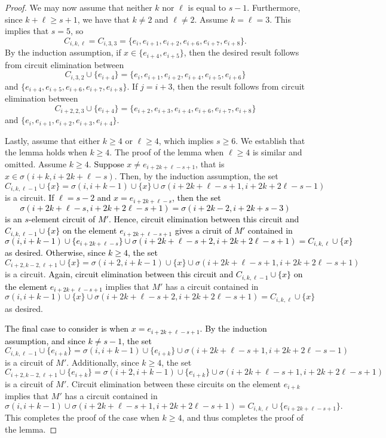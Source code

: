 \documentclass[11pt]{amsart}
\newcommand{\bloo}{\textcolor{black}}
\begin{document}
\begin{proof}
We may now assume that neither $k$ nor $\ell$ is equal to $s-1$. Furthermore, since $k+\ell \geq s+1$, we have that $k \neq 2$ and $\ell \neq 2$. Assume $k = \ell = 3$. This implies that $s = 5$, so
$$C_{i, k, \ell} = C_{i, 3, 3} = \{e_i, e_{i+1}, e_{i+2}, e_{i+6}, e_{i+7}, e_{i+8}\}.$$
By the induction assumption, if $x \in \{e_{i+4}, e_{i+5}\}$, then the desired result follows from circuit elimination between 
\[C_{i, 3, 2} \cup \{e_{i+4}\} = \{e_i, e_{i+1}, e_{i+2}, e_{i+4}, e_{i+5}, e_{i+6}\}\]
and $\{e_{i+4}, e_{i+5}, e_{i+6}, e_{i+7}, e_{i+8}\}$. If $j = i+3$, then the result follows from circuit elimination between 
\[C_{i+2, 2, 3} \cup \{e_{i+4}\} = \{e_{i+2}, e_{i+3}, e_{i+4}, e_{i+6}, e_{i+7}, e_{i+8}\}\]
and $\{e_i, e_{i+1}, e_{i+2}, e_{i+3}, e_{i+4}\}$.

Lastly, assume that either $k\ge 4$ or $\ell\ge 4$, which implies $s\geq 6$. We establish that the lemma holds when $k\ge 4$. The proof of the lemma when $\ell\ge 4$ is similar and omitted. Assume $k\geq 4$. \bloo{Suppose} $x\neq e_{i+2k+\ell-s+1}$, that is $x\in \sigma(i+k, i+2k+\ell-s)$. Then, by the induction assumption, the set 
\[C_{i, k, \ell-1} \cup \{x\} = \sigma(i, i+k-1) \cup \{x\} \cup \sigma(i+2k+\ell-s+1, i+2k+2\ell-s-1)\] 
is a circuit. \bloo{If $\ell=s-2$ and $x = e_{i+2k+\ell-s}$, then the set
\[\sigma(i+2k+\ell-s,i+2k+2\ell-s+1)=\sigma(i+2k-2,i+2k+s-3)\]
is an $s$-element circuit of $M'$. Hence, circuit elimination between this circuit and $C_{i,k,\ell-1}\cup\{x\}$ on the element $e_{i+2k+\ell-s+1}$ gives a ciruit of $M'$ contained in
\[\sigma(i, i+k-1) \cup \{e_{i+2k+\ell-s}\} \cup \sigma(i+2k+\ell-s+2, i+2k+2\ell-s+1) = C_{i, k, \ell} \cup \{x\}\]
as desired. Otherwise, since $k \geq 4$, the set}
\[C_{i+2, k-2,\ell+1} \cup \{x\} = \sigma(i+2, i+k-1) \cup \{x\} \cup \sigma(i+2k+\ell-s+1, i+2k+2\ell-s+1)\]
is a circuit. \bloo{Again, circuit elimination between this circuit and $C_{i,k,\ell-1}\cup\{x\}$ on the element $e_{i+2k+\ell-s+1}$} implies that $M'$ has a circuit contained in
\[\sigma(i, i+k-1) \cup \{x\} \cup \sigma(i+2k+\ell-s+2, i+2k+2\ell-s+1) = C_{i, k, \ell} \cup \{x\}\]
as desired. 

\bloo{The final case to consider is when $x = e_{i+2k+\ell-s+1}$. By the induction assumption, and since $k \neq s-1$, the set}
\[
C_{i,k,\ell-1} \cup \{e_{i+k}\} = \sigma(i,i+k-1) \cup \{e_{i+k}\} \cup \sigma(i+2k+\ell-s+1,i+2k+2\ell-s-1)
\]
is a circuit of $M'$. Additionally, since $k \geq 4$, the set
\[
C_{i+2,k-2,\ell+1} \cup \{e_{i+k}\} = \sigma(i+2,i+k-1) \cup \{e_{i+k}\} \cup \sigma(i+2k+\ell-s+1,i+2k+2\ell-s+1)
\] is a circuit of $M'$. Circuit elimination between these circuits on the element $e_{i+k}$ implies that $M'$ has a circuit contained in
\[
\sigma(i,i+k-1) \cup \sigma(i+2k+\ell-s+1,i+2k+2\ell-s+1) = C_{i,k,\ell} \cup \{e_{i+2k+\ell-s+1}\}.
\]
This completes the proof of the case when $k\ge 4$, and thus completes the proof of the lemma.
\end{proof}
\end{document}
